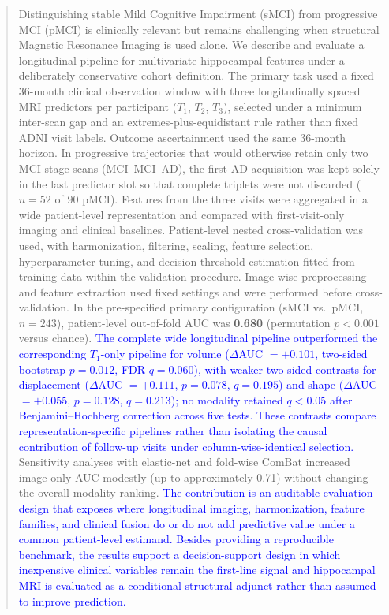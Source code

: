 \documentclass[review]{elsarticle}
\newcommand{\corrigir}[2]{%
	\textcolor{red}{\sout{#1}} %
	\textcolor{blue}{#2}%
}
\begin{document}
\begin{frontmatter}
\begin{abstract}
			Distinguishing stable Mild Cognitive Impairment (sMCI) from progressive MCI (pMCI) is clinically relevant but remains challenging when structural Magnetic Resonance Imaging is used alone. We describe and evaluate a longitudinal pipeline for multivariate hippocampal features under a deliberately conservative cohort definition. The primary task used a fixed 36-month clinical observation window with three longitudinally spaced MRI predictors per participant ($T_1$, $T_2$, $T_3$), selected under a minimum inter-scan gap and an extremes-plus-equidistant rule rather than fixed ADNI visit labels. Outcome ascertainment used the same 36-month horizon. In progressive trajectories that would otherwise retain only two MCI-stage scans (MCI--MCI--AD), the first AD acquisition was kept solely in the last predictor slot so that complete triplets were not discarded ($n=52$ of 90 pMCI). Features from the three visits were aggregated in a wide patient-level representation and compared with first-visit-only imaging and clinical baselines. Patient-level nested cross-validation was used, with harmonization, filtering, scaling, feature selection, hyperparameter tuning, and decision-threshold estimation fitted from training data within the validation procedure. Image-wise preprocessing and feature extraction used fixed settings and were performed before cross-validation. In the pre-specified primary configuration (sMCI vs.\ pMCI, $n=243$), patient-level out-of-fold AUC was \textbf{0.680} (permutation $p<0.001$ versus chance). \corrigir{}{The complete wide longitudinal pipeline outperformed the corresponding $T_1$-only pipeline for volume ($\Delta$AUC $=+0.101$, two-sided bootstrap $p=0.012$, FDR $q=0.060$), with weaker two-sided contrasts for displacement ($\Delta$AUC $=+0.111$, $p=0.078$, $q=0.195$) and shape ($\Delta$AUC $=+0.055$, $p=0.128$, $q=0.213$); no modality retained $q<0.05$ after Benjamini--Hochberg correction across five tests. These contrasts compare representation-specific pipelines rather than isolating the causal contribution of follow-up visits under column-wise-identical selection.} Sensitivity analyses with elastic-net and fold-wise ComBat increased image-only AUC modestly (up to approximately 0.71) without changing the overall modality ranking. \corrigir{}{The contribution is an auditable evaluation design that exposes where longitudinal imaging, harmonization, feature families, and clinical fusion do or do not add predictive value under a common patient-level estimand. Besides providing a reproducible benchmark, the results support a decision-support design in which inexpensive clinical variables remain the first-line signal and hippocampal MRI is evaluated as a conditional structural adjunct rather than assumed to improve prediction.}
			

\end{abstract}
\end{frontmatter}
\end{document}
